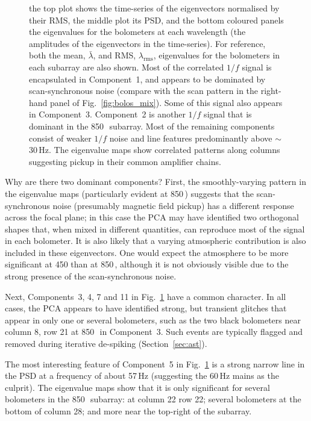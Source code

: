 \documentclass[useAMS,usenatbib,nofootinbib]{mn2e}
\newcommand{\rms}{RMS}
\begin{document}
\begin{figure}
{  the top plot shows the time-series of the eigenvectors normalised by
  their \rms, the middle plot its PSD, and the bottom coloured panels
  the eigenvalues for the bolometers at each wavelength (the
  amplitudes of the eigenvectors in the time-series). For reference,
  both the mean, $\bar{\lambda}$, and \rms, $\lambda_\mathrm{rms}$,
  eigenvalues for the bolometers in each subarray are also shown. Most
  of the correlated $1/f$ signal is encapsulated in Component~1, and
  appears to be dominated by scan-synchronous noise (compare with the
  scan pattern in the right-hand panel of
  Fig.~\ref{fig:bolos_mix}). Some of this signal also appears in
  Component~3. Component~2 is another $1/f$ signal that is dominant in
  the 850\,\micron\ subarray. Most of the remaining components consist
  of weaker $1/f$ noise and line features predominantly above
  $\sim$30\,Hz. The eigenvalue maps show correlated patterns along
  columns suggesting pickup in their common amplifier chains.}
\label{fig:pca}
\end{figure}

Why are there two dominant components? First, the smoothly-varying
pattern in the eigenvalue maps (particularly evident at 850\,\micron)
suggests that the scan-synchronous noise (presumably magnetic field
pickup) has a different response across the focal plane; in this case
the PCA may have identified two orthogonal shapes that, when mixed in
different quantities, can reproduce most of the signal in each
bolometer. It is also likely that a varying atmospheric contribution
is also included in these eigenvectors. One would expect the
atmosphere to be more significant at 450 than at 850\,\micron,
although it is not obviously visible due to the strong presence of the
scan-synchronous noise.

Next, Components~3, 4, 7 and 11 in Fig.~\ref{fig:pca} have a common
character. In all cases, the PCA appears to have identified strong,
but transient glitches that appear in only one or several bolometers,
such as the two black bolometers near column 8, row 21 at
850\,\micron\ in Component~3. Such events are typically flagged and
removed during iterative de-spiking (Section~\ref{sec:ast}).

The most interesting feature of Component~5 in Fig.~\ref{fig:pca} is a
strong narrow line in the PSD at a frequency of about 57\,Hz
(suggesting the 60\,Hz mains as the culprit). The eigenvalue maps show
that it is only significant for several bolometers in the
850\,\micron\ subarray: at column 22 row 22; several bolometers at the
bottom of column 28; and more near the top-right of the subarray.
\end{document}
